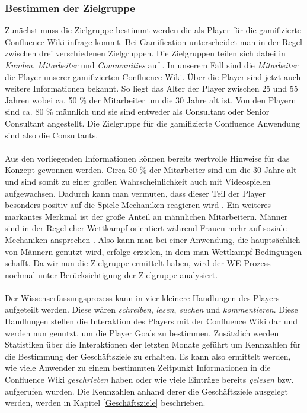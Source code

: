 \documentclass[a4paper,12pt,twoside]{scrartcl}
\begin{document}
\subsubsection{Bestimmen der Zielgruppe}
\label{Zielgruppe}
Zunächst muss die Zielgruppe bestimmt werden die als Player für die gamifizierte Confluence Wiki infrage kommt. Bei Gamification unterscheidet man in der Regel zwischen drei verschiedenen Zielgruppen. Die Zielgruppen teilen sich dabei in \textit{Kunden}, \textit{Mitarbeiter} und \textit{Communities} auf \cite{gamificationDefinition}. In unserem Fall sind die \textit{Mitarbeiter} die Player unserer gamifizierten Confluence Wiki. Über die Player sind jetzt auch weitere Informationen bekannt. So liegt das Alter der Player zwischen 25 und 55 Jahren wobei ca. 50 \% der Mitarbeiter um die 30 Jahre alt ist. Von den Playern sind ca. 80 \% männlich und sie sind entweder als Consultant oder Senior Consultant angestellt. Die Zielgruppe für die gamifizierte Confluence Anwendung sind also die Consultants. 
\\\\
Aus den vorliegenden Informationen können bereits wertvolle Hinweise für das Konzept gewonnen werden. Circa 50 \% der Mitarbeiter sind um die 30 Jahre alt und sind somit zu einer großen Wahrscheinlichkeit auch mit Videospielen aufgewachsen. Dadurch kann man vermuten, dass dieser Teil der Player besonders positiv auf die Spiele-Mechaniken reagieren wird \cite{Persona2018}. Ein weiteres markantes Merkmal ist der große Anteil an männlichen Mitarbeitern. Männer sind in der Regel eher Wettkampf orientiert während Frauen mehr auf soziale Mechaniken ansprechen \cite{Persona2018}. Also kann man bei einer Anwendung, die hauptsächlich von Männern genutzt wird, erfolge erzielen, in dem man Wettkampf-Bedingungen schafft. Da wir nun die Zielgruppe ermittelt haben, wird der WE-Prozess nochmal unter Berücksichtigung der Zielgruppe analysiert. 
\\\\
Der Wissenserfassungsprozess kann in vier kleinere Handlungen des Players aufgeteilt werden. Diese wären \textit{schreiben}, \textit{lesen}, \textit{suchen} und \textit{kommentieren}. Diese Handlungen stellen die Interaktion des Players mit der Confluence Wiki dar und werden nun genutzt, um die Player Goals zu bestimmen. Zusätzlich werden Statistiken über die Interaktionen der letzten Monate geführt um Kennzahlen für die Bestimmung der Geschäftsziele zu erhalten. Es kann also ermittelt werden, wie viele Anwender zu einem bestimmten Zeitpunkt Informationen in die Confluence Wiki \textit{geschrieben} haben oder wie viele Einträge bereits \textit{gelesen} bzw. aufgerufen wurden. Die Kennzahlen anhand derer die Geschäftsziele ausgelegt werden, werden in Kapitel \ref{Geschäftsziele} beschrieben.
\end{document}
